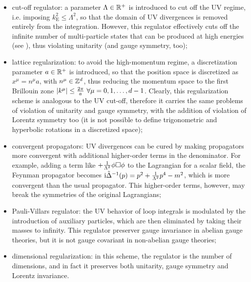 \begin{itemize}
  \item cut-off regulator: a parameter $ \Lambda \in \mathbb{R}^+ $ is introduced to cut off the UV regime, i.e. imposing $ k_\text{E}^2 \leq \Lambda^2 $, so that the domain of UV divergences is removed entirely from the integration. However, this regulator effectively cuts off the infinite number of multi-particle states that can be produced at high energies (see ), thus violating unitarity (and gauge symmetry, too);
  \item lattice regularization: to avoid the high-momentum regime, a discretization parameter $ a \in \mathbb{R}^+ $ is introduced, so that the position space is discretized as $ x^\mu = n^\mu a $, with $ n^\mu \in \mathbb{Z}^d $, thus reducing the momentum space to the first Brillouin zone $ \left\lvert k^\mu\right\rvert \leq \frac{2\pi}{a} \,\, \forall \mu = 0, 1, \dots, d-1 $. Clearly, this regularization scheme is analogous to the UV cut-off, therefore it carries the same problems of violation of unitarity and gauge symmetry, with the addition of violation of Lorentz symmetry too (it is not possible to define trigonometric and hyperbolic rotations in a discretized space);
  \item convergent propagators: UV divergences can be cured by making propagators more convergent with additional higher-order terms in the denominator. For example, adding a term like $ + \frac{1}{\Lambda^2} \phi \Box \phi $ to the Lagrangian for a scalar field, the Feynman propagator becomes $ \mathrm{i} \tilde{\Delta}^{-1}(p) = p^2 + \frac{1}{\Lambda^2} p^4 - m^2 $, which is more convergent than the usual propagator. This higher-order terms, however, may break the symmetries of the original Lagrangians;
  \item Pauli-Villars regulator: the UV behavior of loop integrals is modulated by the introduction of auxiliary particles, which are then eliminated by taking their masses to infinity. This regulator preserver gauge invariance in abelian gauge theories, but it is not gauge covariant in non-abelian gauge theories;
  \item dimensional regularization: in this scheme, the regulator is the number of dimensions, and in fact it preserves both unitarity, gauge symmetry and Lorentz invariance.
\end{itemize}

